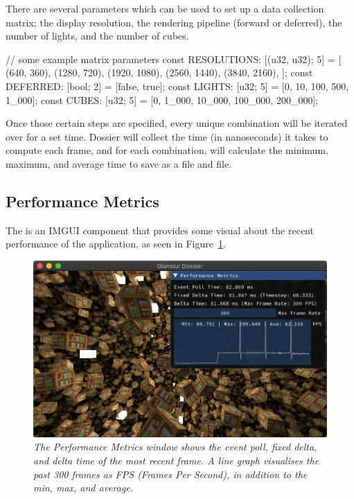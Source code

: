 There are several parameters which can be used to set up a data collection matrix; the display resolution, the rendering pipeline (forward or deferred), the number of lights, and the number of cubes.

  \begin{rustcode}
// some example matrix parameters
const RESOLUTIONS: [(u32, u32); 5] = [
    (640, 360),
    (1280, 720),
    (1920, 1080),
    (2560, 1440),
    (3840, 2160),
];
const DEFERRED: [bool; 2] = [false, true];
const LIGHTS: [u32; 5] = [0, 10, 100, 500, 1_000];
const CUBES: [u32; 5] = [0, 1_000, 10_000, 100_000, 200_000];
  \end{rustcode}

Once those certain steps are specified, every unique combination will be iterated over for a set time.
Dossier will collect the time (in nanoseconds) it takes to compute each frame, and for each combination, will calculate the minimum, maximum, and average time to save as a  file and  file.

\subsection{Performance Metrics}
The  is an IMGUI component that provides some visual about the recent performance of the application, as seen in Figure~\ref{fig:perf-metrics}.

\begin{figure}
  \begin{center}
    \includegraphics[width=0.6\columnwidth]{../perf-metrics.png}
  \end{center}
  \caption[PerfMetricsLayer]{
    \emph{
      The Performance Metrics window shows the event poll, fixed delta, and delta time of the most recent frame.
      A line graph visualises the past 300 frames as FPS (Frames Per Second), in addition to the min, max, and average.
    }
  }\label{fig:perf-metrics}
\end{figure}

